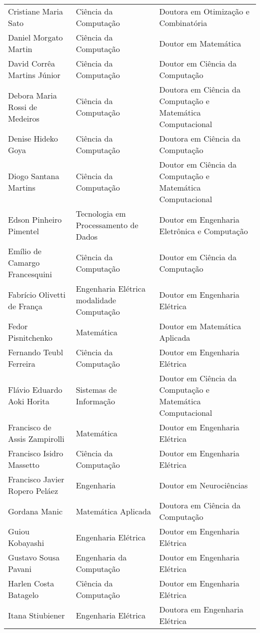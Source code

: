 {\begin{longtable}{|p{}|p{}|p{}|}
    Cristiane Maria Sato & Ciência da Computação & Doutora em Otimização e Combinatória \\
    Daniel Morgato Martin & Ciência da Computação & Doutor em Matemática \\
    David Corrêa Martins Júnior & Ciência da Computação & Doutor em Ciência da Computação \\
    Debora Maria Rossi de Medeiros & Ciência da Computação & Doutora em Ciência da Computação e Matemática Computacional \\
    Denise Hideko Goya & Ciência da Computação & Doutora em Ciência da Computação \\
    Diogo Santana Martins & Ciência da Computação & Doutor em Ciência da Computação e Matemática Computacional \\
    Edson Pinheiro Pimentel & Tecnologia em Processamento de Dados & Doutor em Engenharia Eletrônica e Computação \\
    Emílio de Camargo Francesquini & Ciência da Computação & Doutor em Ciência da Computação \\
    Fabrício Olivetti de França & Engenharia Elétrica modalidade Computação & Doutor em Engenharia Elétrica \\
    Fedor Pisnitchenko & Matemática & Doutor em Matemática Aplicada \\
    Fernando Teubl Ferreira & Ciência da Computação & Doutor em Engenharia Elétrica \\
    Flávio Eduardo Aoki Horita & Sistemas de Informação & Doutor em Ciência da Computação e Matemática Computacional \\
    Francisco de Assis Zampirolli & Matemática & Doutor em Engenharia Elétrica \\
    Francisco Isidro Massetto & Ciência da Computação & Doutor em Engenharia Elétrica \\
    Francisco Javier Ropero Peláez & Engenharia & Doutor em Neurociências \\
    Gordana Manic & Matemática Aplicada & Doutora em Ciência da Computação \\
    Guiou Kobayashi & Engenharia Elétrica & Doutor em Engenharia Elétrica \\
    Gustavo Sousa Pavani & Engenharia da Computação & Doutor em Engenharia Elétrica \\
    Harlen Costa Batagelo & Ciência da Computação & Doutor em Engenharia Elétrica \\
    Itana Stiubiener & Engenharia Elétrica & Doutora em Engenharia Elétrica \\

\end{longtable}}
